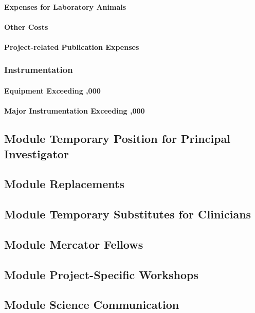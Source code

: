 \documentclass[a4paper,11pt]{amsart}
\newcommand{\euro}{\texteuro}
\theoremstyle{definition}
\newcommand{\<}{\langle}
\renewcommand{\>}{\rangle}
\begin{document}
\paragraph{Expenses for Laboratory Animals}

\paragraph{Other Costs}

\paragraph{Project-related Publication Expenses}


\subsubsection{Instrumentation}
\paragraph{Equipment Exceeding \euro 10,000}
\paragraph{Major Instrumentation Exceeding \euro 50,000}

\subsection{Module Temporary Position for Principal Investigator}
\subsection{Module Replacements}
\subsection{Module Temporary Substitutes for Clinicians}
\subsection{Module Mercator Fellows}
\subsection{Module Project-Specific Workshops}
\subsection{Module Science Communication}
\end{document}
